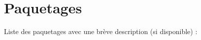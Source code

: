 \section{Paquetages}
Liste des paquetages avec une brève description (si disponible) \+:\begin{DoxyCompactList}
\item{}
\end{DoxyCompactList}
